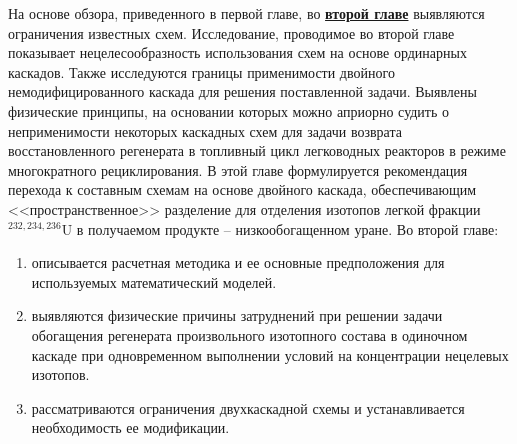 На основе обзора, приведенного в первой главе, во \underline{\textbf{второй главе}}  выявляются ограничения известных схем. Исследование, проводимое во второй главе показывает  нецелесообразность использования схем на основе ординарных каскадов. Также исследуются границы применимости двойного немодифицированного каскада для решения поставленной задачи. Выявлены физические принципы, на основании которых можно априорно судить о неприменимости некоторых каскадных схем для задачи возврата восстановленного регенерата в топливный цикл легководных реакторов в режиме многократного рециклирования. В этой главе формулируется рекомендация перехода к составным схемам на основе двойного каскада, обеспечивающим <<пространственное>> разделение для отделения изотопов легкой фракции $^{232,234,236}$U в получаемом продукте -- низкообогащенном уране.
Во второй главе:
\begin{enumerate}
  \item описывается расчетная методика и ее основные предположения для используемых математический моделей.
  \item выявляются физические причины затруднений при решении задачи обогащения регенерата произвольного изотопного состава в одиночном каскаде при одновременном выполнении условий на концентрации нецелевых изотопов.
  \item рассматриваются ограничения двухкаскадной схемы и устанавливается необходимость ее модификации.
\end{enumerate}

